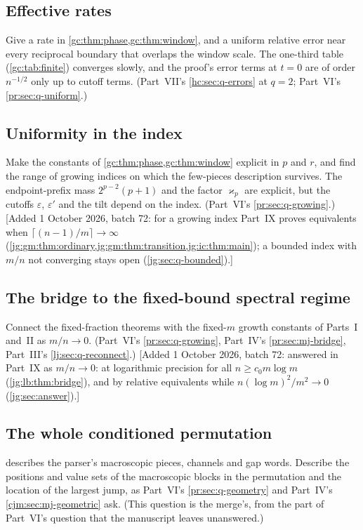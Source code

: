 \documentclass[11pt,a4paper]{article}
\theoremstyle{definition}\newaliascnt{definition}{theorem}
\theoremstyle{remark}\newaliascnt{remark}{theorem}
\begin{document}
\subsection{Effective rates}
\label{gc:sec:q-rate}
Give a rate in \cref{gc:thm:phase,gc:thm:window}, and a uniform relative error
near every reciprocal boundary that overlaps the window scale. The one-third
table (\cref{gc:tab:finite}) converges slowly, and the proof's error terms at
$t=0$ are of order $n^{-1/2}$ only up to cutoff terms. (Part~VII's
\cref{hc:sec:q-errors} at $q=2$; Part~VI's \cref{pr:sec:q-uniform}.)

\subsection{Uniformity in the index}
\label{gc:sec:q-index}
Make the constants of \cref{gc:thm:phase,gc:thm:window} explicit in $p$ and $r$,
and find the range of growing indices on which the few-pieces description
survives. The endpoint-prefix mass $2^{p-2}(p+1)$ and the factor $\varkappa_p$
are explicit, but the cutoffs $\varepsilon$, $\varepsilon'$ and the tilt
depend on the index. (Part~VI's \cref{pr:sec:q-growing}.)
[Added 1 October 2026, batch 72: for a growing index Part~IX proves
equivalents when $\lceil(n-1)/m\rceil\to\infty$
(\cref{jg:gm:thm:ordinary,jg:gm:thm:transition,jg:ic:thm:main}); a bounded
index with $m/n$ not converging stays open (\cref{jg:sec:q-bounded}).]

\subsection{The bridge to the fixed-bound spectral regime}
\label{gc:sec:q-spectral}
Connect the fixed-fraction theorems with the fixed-$m$ growth constants of
Parts~I and~II as $m/n\to0$. (Part~VI's \cref{pr:sec:q-growing}, Part~IV's
\cref{pr:sec:mj-bridge}, Part~III's \cref{lj:sec:q-reconnect}.)
[Added 1 October 2026, batch 72: answered in Part~IX as $m/n\to0$: at
logarithmic precision for all $n\ge c_0m\log m$ (\cref{jg:lb:thm:bridge}),
and by relative equivalents while $n(\log m)^2/m^2\to0$
(\cref{jg:sec:answer}).]

\subsection{The whole conditioned permutation}
\label{gc:sec:q-whole}
 describes the parser's macroscopic pieces, channels and
gap words. Describe the positions and value sets of the macroscopic blocks in
the permutation and the location of the largest jump, as Part~VI's
\cref{pr:sec:q-geometry} and Part~IV's \cref{cjm:sec:mj-geometric} ask. (This
question is the merge's, from the part of Part~VI's question that the
manuscript leaves unanswered.)
\end{document}
